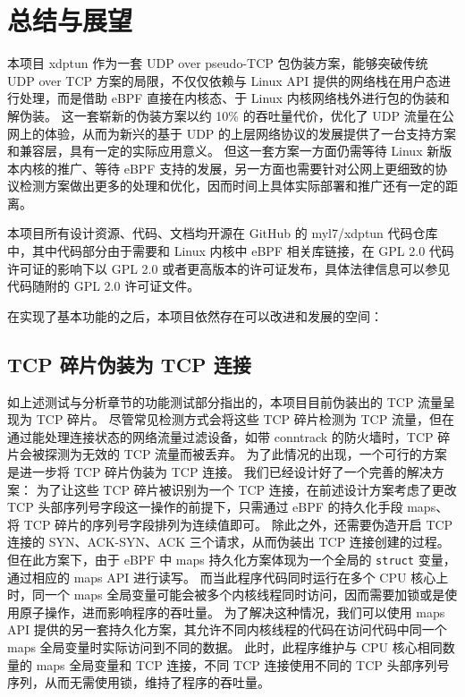 

\chapter{总结与展望}

本项目 xdptun 作为一套 UDP over pseudo-TCP 包伪装方案，能够突破传统 UDP over TCP 方案的局限，不仅仅依赖与 Linux API 提供的网络栈在用户态进行处理，而是借助 eBPF
直接在内核态、于 Linux 内核网络栈外进行包的伪装和解伪装。
这一套崭新的伪装方案以约 10\% 的吞吐量代价，优化了 UDP 流量在公网上的体验，从而为新兴的基于 UDP 的上层网络协议的发展提供了一台支持方案和兼容层，具有一定的实际应用意义。
但这一套方案一方面仍需等待 Linux 新版本内核的推广、等待 eBPF 支持的发展，另一方面也需要针对公网上更细致的协议检测方案做出更多的处理和优化，因而时间上具体实际部署和推广还有一定的距离。

本项目所有设计资源、代码、文档均开源在 GitHub 的 myl7/xdptun 代码仓库中，其中代码部分由于需要和 Linux 内核中 eBPF 相关库链接，在 GPL 2.0 代码许可证的影响下以 GPL 2.0 或者更高版本的许可证发布，具体法律信息可以参见代码随附的 GPL 2.0 许可证文件。

在实现了基本功能的之后，本项目依然存在可以改进和发展的空间：

\section{TCP 碎片伪装为 TCP 连接}

如上述测试与分析章节的功能测试部分指出的，本项目目前伪装出的 TCP 流量呈现为 TCP 碎片。
尽管常见检测方式会将这些 TCP 碎片检测为 TCP 流量，但在通过能处理连接状态的网络流量过滤设备，如带 conntrack 的防火墙时，TCP 碎片会被探测为无效的 TCP 流量而被丢弃。
为了此情况的出现，一个可行的方案是进一步将 TCP 碎片伪装为 TCP 连接。
我们已经设计好了一个完善的解决方案：
为了让这些 TCP 碎片被识别为一个 TCP 连接，在前述设计方案考虑了更改 TCP 头部序列号字段这一操作的前提下，只需通过 eBPF 的持久化手段 maps、将 TCP 碎片的序列号字段排列为连续值即可。
除此之外，还需要伪造开启 TCP 连接的 SYN、ACK-SYN、ACK 三个请求，从而伪装出 TCP 连接创建的过程。
但在此方案下，由于 eBPF 中 maps 持久化方案体现为一个全局的 \texttt{struct} 变量，通过相应的 maps API 进行读写。
而当此程序代码同时运行在多个 CPU 核心上时，同一个 maps 全局变量可能会被多个内核线程同时访问，因而需要加锁或是使用原子操作，进而影响程序的吞吐量。
为了解决这种情况，我们可以使用 maps API 提供的另一套持久化方案，其允许不同内核线程的代码在访问代码中同一个 maps 全局变量时实际访问到不同的数据。
此时，此程序维护与 CPU 核心相同数量的 maps 全局变量和 TCP 连接，不同 TCP 连接使用不同的 TCP 头部序列号序列，从而无需使用锁，维持了程序的吞吐量。

